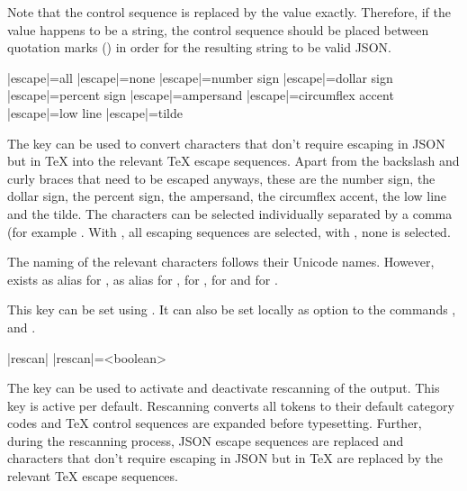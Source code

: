 \documentclass[a4paper]{article}
\begin{document}
{{\begin{codeexamplecolumns}

\end{codeexamplecolumns}

Note that the control sequence \macro{\x} is replaced by the value exactly. Therefore, if the value happens to be a string, the control sequence \macro{\x} should be placed between quotation marks () in order for the resulting string to be valid JSON.

\begin{macrodef}
|escape|={all}
|escape|={none}
|escape|={number sign}
|escape|={dollar sign}
|escape|={percent sign}
|escape|={ampersand}
|escape|={circumflex accent}
|escape|={low line}
|escape|={tilde}
\end{macrodef}
The key  can be used to convert characters that don't require escaping in JSON but in TeX into the relevant TeX escape sequences. Apart from the backslash and curly braces that need to be escaped anyways, these are the number sign, the dollar sign, the percent sign, the ampersand, the circumflex accent, the low line and the tilde. The characters can be selected individually separated by a comma (for example . With , all escaping sequences are selected, with , none is selected. 

The naming of the relevant characters follows their Unicode names. However,  exists as alias for ,  as alias for ,  for ,  for  and  for .

This key can be set using \macro{\JSONParseSet}. It can also be set locally as option to the commands \macro{\JSONParseValue}, \macro{\JSONParseArrayValues} and \macro{\JSONParseArrayValuesMap}.

\begin{macrodef}
|rescan|
|rescan|={<boolean>}
\end{macrodef}
The key  can be used to activate and deactivate rescanning of the output. This key is active per default. Rescanning converts all tokens to their default category codes and TeX control sequences are expanded before typesetting. Further, during the rescanning process, JSON escape sequences are replaced and characters that don't require escaping in JSON but in TeX are replaced by the relevant TeX escape sequences.

}}
\end{document}
